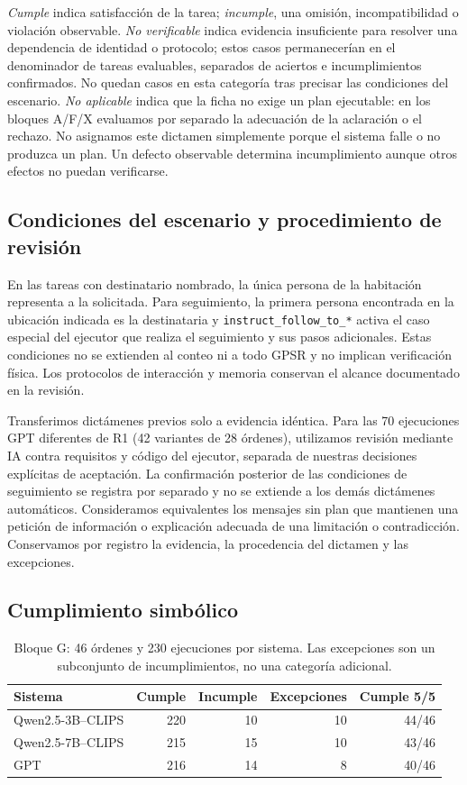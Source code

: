 \documentclass[a4paper,twoside]{article}
\begin{document}
\emph{Cumple} indica satisfacción de la tarea; \emph{incumple}, una omisión, incompatibilidad o violación observable. \emph{No verificable} indica evidencia insuficiente para resolver una dependencia de identidad o protocolo; estos casos permanecerían en el denominador de tareas evaluables, separados de aciertos e incumplimientos confirmados. No quedan casos en esta categoría tras precisar las condiciones del escenario. \emph{No aplicable} indica que la ficha no exige un plan ejecutable: en los bloques A/F/X evaluamos por separado la adecuación de la aclaración o el rechazo. No asignamos este dictamen simplemente porque el sistema falle o no produzca un plan. Un defecto observable determina incumplimiento aunque otros efectos no puedan verificarse.

\subsection{Condiciones del escenario y procedimiento de revisión}
En las tareas con destinatario nombrado, la única persona de la habitación representa a la solicitada. Para seguimiento, la primera persona encontrada en la ubicación indicada es la destinataria y \texttt{instruct\_follow\_to\_*} activa el caso especial del ejecutor que realiza el seguimiento y sus pasos adicionales. Estas condiciones no se extienden al conteo ni a todo GPSR y no implican verificación física. Los protocolos de interacción y memoria conservan el alcance documentado en la revisión.

Transferimos dictámenes previos solo a evidencia idéntica. Para las 70 ejecuciones GPT diferentes de R1 (42 variantes de 28 órdenes), utilizamos revisión mediante IA contra requisitos y código del ejecutor, separada de nuestras decisiones explícitas de aceptación. La confirmación posterior de las condiciones de seguimiento se registra por separado y no se extiende a los demás dictámenes automáticos. Consideramos equivalentes los mensajes sin plan que mantienen una petición de información o explicación adecuada de una limitación o contradicción. Conservamos por registro la evidencia, la procedencia del dictamen y las excepciones.

\subsection{Cumplimiento simbólico}

\begin{table}[t]
\centering\small
\caption{Bloque G: 46 órdenes y 230 ejecuciones por sistema. Las excepciones son un subconjunto de incumplimientos, no una categoría adicional.}
\label{tab:resultados_g}
\begin{tabular}{@{}lrrrr@{}}
\toprule
Sistema & Cumple & Incumple & Excepciones & Cumple 5/5 \\
\midrule
Qwen2.5-3B--CLIPS & 220 & 10 & 10 & 44/46 \\
Qwen2.5-7B--CLIPS & 215 & 15 & 10 & 43/46 \\
GPT & 216 & 14 & 8 & 40/46 \\
\bottomrule
\end{tabular}
\end{table}
\end{document}
